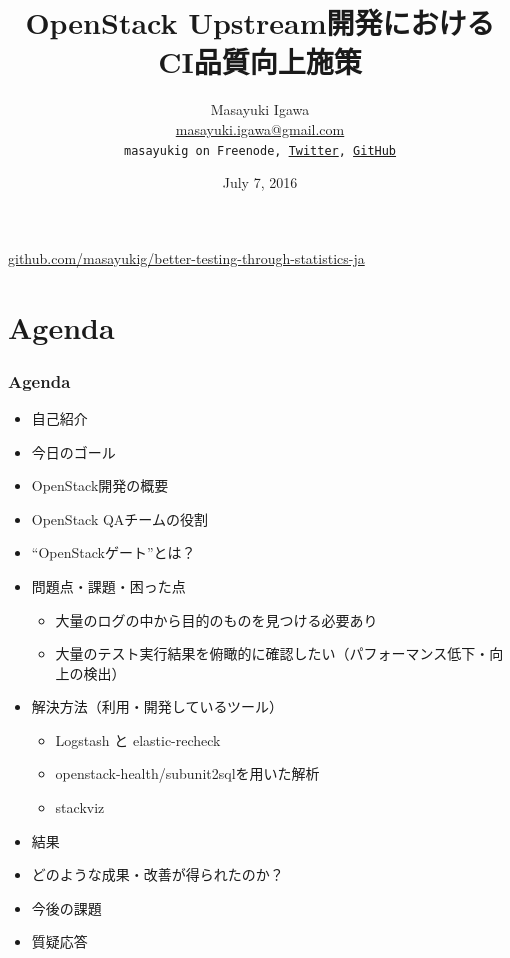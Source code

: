 \documentclass[aspectratio=169,11pt,hyperref={colorlinks=true}]{beamer}
\author[Masayuki Igawa]{%
    \texorpdfstring{%
        \centering
        Masayuki Igawa\\
        \href{mailto:masayuki.igawa@gmail.com}{masayuki.igawa@gmail.com}\\
        \texttt{masayukig on Freenode,
         \href{https://twitter.com/masayukig}{Twitter},
         \href{https://github.com/masayukig}{GitHub}}
    }
    {Masayuki Igawa}
}
\date{July 7, 2016}
\title[OpenStack Upstream開発におけるCI品質向上施策
\hspace{2em}\insertframenumber/\inserttotalframenumber]{OpenStack Upstream開発におけるCI品質向上施策}
\begin{document}


{%
\begin{frame}[noframenumbering]
  \hypersetup{colorlinks,urlcolor=white}
  \titlepage{}
  \centering
  \href{https://github.com/masayukig/better-testing-through-statistics-ja}{github.com/masayukig/better-testing-through-statistics-ja}
\end{frame}
}

\section{Agenda}
\begin{frame}
  \frametitle{Agenda}
  \begin{itemize}
    \item 自己紹介
    \item 今日のゴール
    \item OpenStack開発の概要
    \item OpenStack QAチームの役割
    \item ``OpenStackゲート''とは？
    \item 問題点・課題・困った点
      \begin{itemize}
        \item 大量のログの中から目的のものを見つける必要あり
        \item 大量のテスト実行結果を俯瞰的に確認したい（パフォーマンス低下・向上の検出）
      \end{itemize}
    \item 解決方法（利用・開発しているツール）
      \begin{itemize}
        \item Logstash と elastic-recheck
        \item openstack-health/subunit2sqlを用いた解析
        \item stackviz
      \end{itemize}
    \item 結果
    \item どのような成果・改善が得られたのか？
    \item 今後の課題
    \item 質疑応答
  \end{itemize}
\end{frame}
\end{document}
